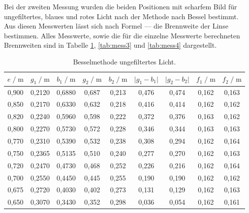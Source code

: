 Bei der zweiten Messung wurden die beiden Positionen mit scharfem Bild für ungefiltertes, 
blaues und rotes Licht nach der Methode nach Bessel bestimmt. Aus diesen Messwerten lässt 
sich nach Formel --- die Brennweite der Linse bestimmen. Alles Messwerte, sowie die für die
einzelne Messwerte berechneten Brennweiten sind in Tabelle \ref{tab:mess2}, 
\ref{tab:mess3} und \ref{tab:mess4} dargestellt. 

\begin{table}
    \centering
    \caption{Besselmethode ungefiltertes Licht.}
    \label{tab:mess2}
    \begin{tabular}{c c c c c c c c c}
    \toprule
    $ e \;/\; \si{\meter} $ & $g_1 \;/\; \si{\meter}$ &
    $ b_1 \;/\; \si{\meter}$ & $g_2 \;/\; \si{\meter}$ & 
    $ b_2 \;/\; \si{\meter}$ & $\vert g_1 - b_1 \vert$ & 
    $ \vert g_2 - b_2 \vert$ & $ f_1 \;/\; \si{\meter}$ &
    $ f_2 \;/\; \si{\meter}$\\
    \midrule 
        0,900 & 0,2120 & 0,6880 & 0,687 & 0,213 & 0,476 & 0,474 & 0,162 & 0,163\\
        0,850 & 0,2170 & 0,6330 & 0,632 & 0,218 & 0,416 & 0,414 & 0,162 & 0,162\\
        0,820 & 0,2240 & 0,5960 & 0,598 & 0,222 & 0,372 & 0,376 & 0,163 & 0,162\\
        0,800 & 0,2270 & 0,5730 & 0,572 & 0,228 & 0,346 & 0,344 & 0,163 & 0,163\\
        0,770 & 0,2310 & 0,5390 & 0,532 & 0,238 & 0,308 & 0,294 & 0,162 & 0,164\\
        0,750 & 0,2365 & 0,5135 & 0,510 & 0,240 & 0,277 & 0,270 & 0,162 & 0,163\\
        0,720 & 0,2470 & 0,4730 & 0,468 & 0,252 & 0,226 & 0,216 & 0,162 & 0,164\\
        0,700 & 0,2550 & 0,4450 & 0,445 & 0,255 & 0,190 & 0,190 & 0,162 & 0,162\\
        0,675 & 0,2720 & 0,4030 & 0,402 & 0,273 & 0,131 & 0,129 & 0,162 & 0,163\\
        0,650 & 0,3070 & 0,3430 & 0,352 & 0,298 & 0,036 & 0,054 & 0,162 & 0,161\\          
    \bottomrule
    \end{tabular}
    \end{table}

